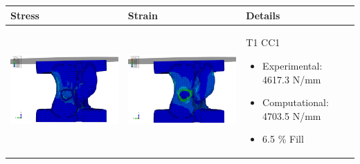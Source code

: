 \documentclass[11pt,a4paper]{article}
\begin{document}
\begin{landscape}

\begin{longtable}{|m{11cm}|m{11cm}|m{4cm}|}
Stress & Strain & Details \\ \hline
\includegraphics[width=10cm]{images/T1_CC1_postVP_Interface_ABAQUS_All_Side_Stress.png}   & \includegraphics[width=10cm]{images/T1_CC1_postVP_Interface_ABAQUS_All_Side_Strain.png}   & T1 CC1 \begin{itemize} \item Experimental: 	4617.3	N/mm  \item Computational:	4703.5  N/mm \item 6.5 \% Fill \end{itemize} \\ \hline 


\end{longtable}
\end{landscape}
\end{document}
